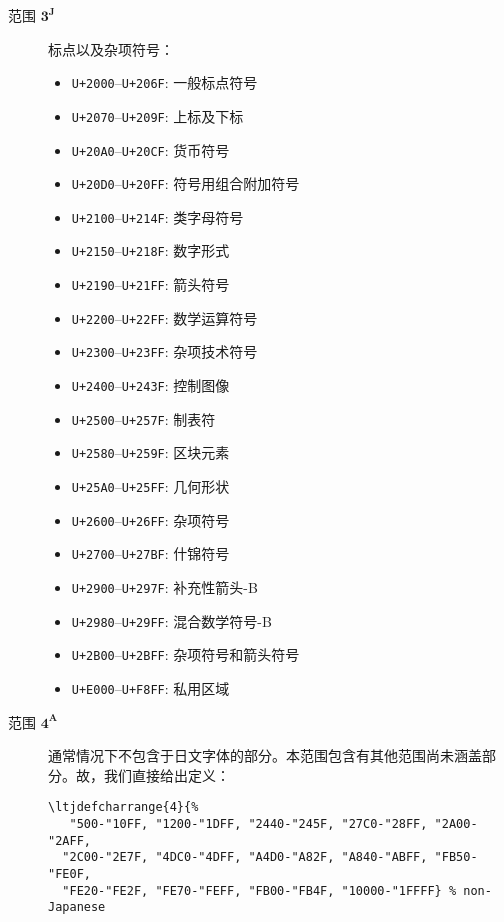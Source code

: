 \documentclass{ltjarticle}
\begin{document}
\begin{description}
\item[范围 $\mathbf{3^J}$] 标点以及杂项符号：
\begin{multicols}{2}
	\begin{itemize}
	\item \texttt{U+2000}--\texttt{U+206F}: 一般标点符号
	\item \texttt{U+2070}--\texttt{U+209F}: 上标及下标
	\item \texttt{U+20A0}--\texttt{U+20CF}: 货币符号
	\item \texttt{U+20D0}--\texttt{U+20FF}: 符号用组合附加符号
	\item \texttt{U+2100}--\texttt{U+214F}: 类字母符号
	\item \texttt{U+2150}--\texttt{U+218F}: 数字形式
	\item \texttt{U+2190}--\texttt{U+21FF}: 箭头符号
	\item \texttt{U+2200}--\texttt{U+22FF}: 数学运算符号
	\item \texttt{U+2300}--\texttt{U+23FF}: 杂项技术符号
	\item \texttt{U+2400}--\texttt{U+243F}: 控制图像
	\item \texttt{U+2500}--\texttt{U+257F}: 制表符
	\item \texttt{U+2580}--\texttt{U+259F}: 区块元素
	\item \texttt{U+25A0}--\texttt{U+25FF}: 几何形状
	\item \texttt{U+2600}--\texttt{U+26FF}: 杂项符号
	\item \texttt{U+2700}--\texttt{U+27BF}: 什锦符号
	\item \texttt{U+2900}--\texttt{U+297F}: 补充性箭头-B
	\item \texttt{U+2980}--\texttt{U+29FF}: 混合数学符号-B
	\item \texttt{U+2B00}--\texttt{U+2BFF}: 杂项符号和箭头符号
	\item \texttt{U+E000}--\texttt{U+F8FF}: 私用区域
	\end{itemize}
\end{multicols}

\item[范围 $\mathbf{4^A}$] 通常情况下不包含于日文字体的部分。本范围包含有其他范围尚未涵盖部分。故，我们直接给出定义：
\begin{verbatim}
\ltjdefcharrange{4}{%
   "500-"10FF, "1200-"1DFF, "2440-"245F, "27C0-"28FF, "2A00-"2AFF, 
  "2C00-"2E7F, "4DC0-"4DFF, "A4D0-"A82F, "A840-"ABFF, "FB50-"FE0F, 
  "FE20-"FE2F, "FE70-"FEFF, "FB00-"FB4F, "10000-"1FFFF} % non-Japanese
\end{verbatim}


\end{description}
\end{document}
